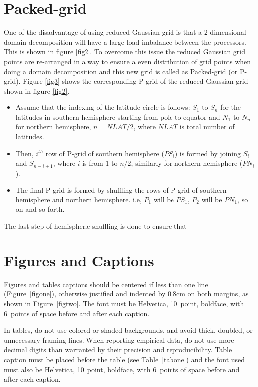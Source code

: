 \documentclass{SBCbookchapter}
\begin{document}
\section{Packed-grid}
One of the disadvantage of using reduced Gaussian grid is that a 2 dimensional domain decomposition will have a large load imbalance between the processors. This is shown in figure \ref{fig2}. To overcome this issue the reduced Gaussian grid points are re-arranged in a way to ensure a even distribution of grid points when doing a domain decomposition and this new grid is called as Packed-grid (or P-grid). Figure \ref{fig3} shows the corresponding P-grid of the reduced Gaussian grid shown in figure \ref{fig2}.  
\begin{itemize}
	\item Assume that the indexing of the latitude circle is follows: $S_1$ to $S_{n}$ for the latitudes in southern hemisphere starting from pole to equator and $N_1$ to $N_{n}$ for northern hemisphere, $n=NLAT/2$, where $NLAT$ is total number of latitudes.
	\item Then, $i^{th}$ row of P-grid of southern hemisphere ($PS_{i}$) is formed by joining $S_{i}$ and $S_{n-i+1}$, where $i$ is from $1$ to $n/2$, similarly for northern hemisphere ($PN_{i}$).
	\item The final P-grid is formed by shuffling the rows of P-grid of southern hemisphere and northern hemisphere. i.e, $P_1$ will be $PS_1$, $P_2$ will be $PN_1$, so on and so forth.
\end{itemize}
The last step of hemispheric shuffling is done to ensure that 

\section{Figures and Captions}
\label{sec:captionmargins}
Figures and tables captions should be centered if less than one line
(Figure~\ref{figone}), otherwise justified and indented by 0.8cm on
both margins, as shown in Figure~\ref{figtwo}. The font must be
Helvetica, 10~point, boldface, with 6~points of space before and after
each caption.



In tables, do not use colored or shaded backgrounds, and avoid thick,
doubled, or unnecessary framing lines. When reporting empirical data,
do not use more decimal digits than warranted by their precision and
reproducibility. Table caption must be placed before the table (see
Table~\ref{tabone}) and the font used must also be Helvetica,
10~point, boldface, with 6~points of space before and after each
caption.
\end{document}
